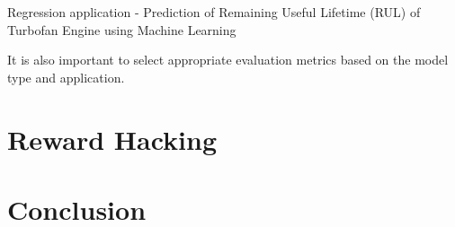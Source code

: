 \documentclass[a4paper,12pt]{report}
\begin{document}
Regression application - Prediction of Remaining Useful Lifetime (RUL) of
Turbofan Engine using Machine Learning 

It is also important to select appropriate evaluation metrics based on the model type and application.

\chapter{Reward Hacking}

\chapter{Conclusion}

\renewcommand{\bibname}{References}


\end{document}
